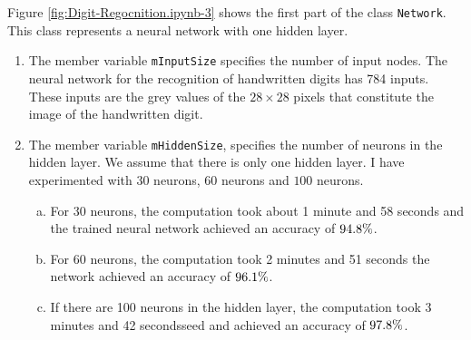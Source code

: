 Figure \ref{fig:Digit-Regocnition.ipynb-3} shows the first part of the class \texttt{Network}.  This class
represents a neural network with one hidden layer. 
\begin{enumerate}
\item The member variable \texttt{mInputSize} specifies the number of input nodes.  The neural network for the
      recognition of handwritten digits has 784 inputs.  These inputs are the grey values of the $28 \times 28$
      pixels that constitute the image of the handwritten digit.
\item The member variable \texttt{mHiddenSize}, specifies the number of neurons in the hidden layer.  We assume that
      there is only one hidden layer.  I have experimented with 30 neurons, 60 neurons and $100$ neurons.
      \begin{enumerate}[(a)]
      \item For 30 neurons, the computation took about 1 minute and 58 seconds and the trained neural network achieved an
            accuracy of $94.8\symbol{37}$.
      \item For 60 neurons, the computation took 2 minutes and 51 seconds the network achieved an accuracy of
            $96.1\symbol{37}$.
      \item If there are 100 neurons in the hidden layer, the computation took 3 minutes and 42 secondsseed and achieved an
            accuracy of $97.8\symbol{37}$.


\end{enumerate}
\end{enumerate}

